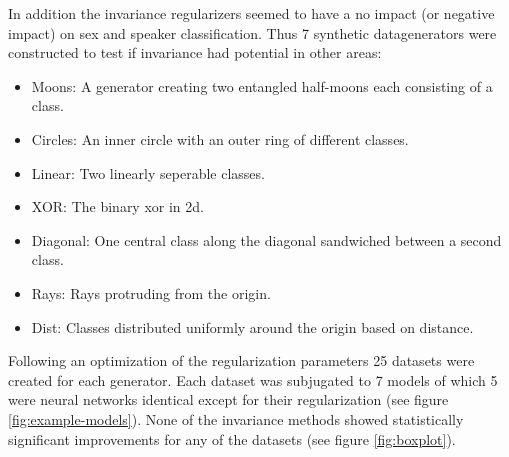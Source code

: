 In addition the invariance regularizers seemed to have a no impact (or negative impact) on sex and speaker classification. Thus 7 synthetic datagenerators were constructed to test if invariance had potential in other areas:
\begin{itemize}
\item{Moons: A generator creating two entangled half-moons each consisting of a class.}
\item{Circles: An inner circle with an outer ring of different classes.}
\item{Linear: Two linearly seperable classes.}
\item{XOR: The binary xor in 2d.}
\item{Diagonal: One central class along the diagonal sandwiched between a second class.}
\item{Rays: Rays protruding from the origin.}
\item{Dist: Classes distributed uniformly around the origin based on distance.}
\end{itemize}

Following an optimization of the regularization parameters 25 datasets were created for each generator. Each dataset was subjugated to 7 models of which 5 were neural networks identical except for their regularization (see figure \ref{fig:example-models}). None of the invariance methods showed statistically significant improvements for any of the datasets (see figure \ref{fig:boxplot}).
